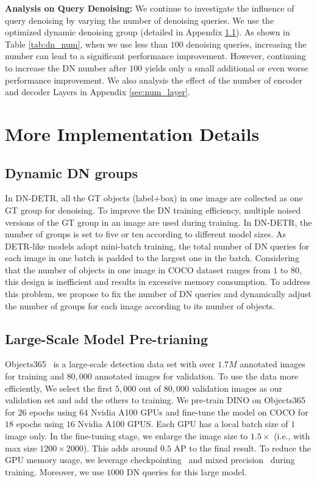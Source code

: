 \documentclass[runningheads]{llncs}
\begin{document}
\textbf{Analysis on Query Denoising:} We continue to investigate the influence of query denoising by varying the number of denoising queries. We use the optimized dynamic denoising group (detailed in Appendix \ref{sec:ddg}). As shown in Table \ref{tab:dn_num}, when we use less than $100$ denoising queries, increasing the number can lead to a significant performance improvement. However, continuing to increase the DN number after $100$ yields only a small additional or even worse performance improvement. 
We also analysis the effect of the number of encoder and decoder Layers in Appendix \ref{sec:num_layer}.

\section{More Implementation Details}\label{sec:more_imp_details}
\subsection{Dynamic DN groups}\label{sec:ddg}
In DN-DETR, all the GT objects (label+box) in one image are collected as one GT group for denoising. To improve the DN training efficiency,  multiple noised versions of the GT group in an image are used during training. In DN-DETR, the number of groups is set to five or ten according to different model sizes. As DETR-like models adopt mini-batch training, the total number of DN queries for each image in one batch is padded to the largest one in the batch. Considering that the number of objects in one image in COCO dataset ranges from $1$ to $80$, this design is inefficient and results in excessive memory consumption. To address this problem, we propose to fix the number of DN queries and dynamically adjust the number of groups for each image according to its number of objects.

\subsection{Large-Scale Model Pre-trianing}
Objects365~\cite{shao2019objects365} is a large-scale detection data set with over $1.7M$ annotated images for training and $80,000$ annotated images for validation. To use the data more efficiently, We select the first $5,000$ out of $80,000$ validation images as our validation set and add the others to training.
We pre-train DINO on Objects365 for $26$ epochs using $64$ Nvidia A100 GPUs and fine-tune the model on COCO for $18$ epochs using $16$ Nvidia A100 GPUS. Each GPU has a local batch size of $1$ image only. In the fine-tuning stage, we enlarge the image size to $1.5\times$ (i.e., with max size $1200\times 2000$). This adds around $0.5$ AP to the final result. To reduce the GPU memory usage, we leverage checkpointing~\cite{chen2016training} and mixed precision~\cite{micikevicius2018mixed} during training. Moreover, we use $1000$ DN queries for this large model.
\end{document}
